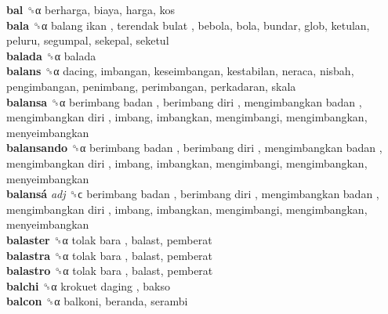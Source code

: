\textbf{bal} ␝α  berharga, biaya, harga, kos  \\
\textbf{bala} ␝α   balang ikan ,  terendak bulat , bebola, bola, bundar, glob, ketulan, peluru, segumpal, sekepal, seketul  \\
\textbf{balada} ␝α  balada  \\
\textbf{balans} ␝α  dacing, imbangan, keseimbangan, kestabilan, neraca, nisbah, pengimbangan, penimbang, perimbangan, perkadaran, skala  \\
\textbf{balansa} ␝α   berimbang badan ,  berimbang diri ,  mengimbangkan badan ,  mengimbangkan diri , imbang, imbangkan, mengimbangi, mengimbangkan, menyeimbangkan  \\
\textbf{balansando} ␝α   berimbang badan ,  berimbang diri ,  mengimbangkan badan ,  mengimbangkan diri , imbang, imbangkan, mengimbangi, mengimbangkan, menyeimbangkan  \\
\textbf{balansá} \emph{adj}  ␝ϲ   berimbang badan ,  berimbang diri ,  mengimbangkan badan ,  mengimbangkan diri , imbang, imbangkan, mengimbangi, mengimbangkan, menyeimbangkan  \\
\textbf{balaster} ␝α   tolak bara , balast, pemberat  \\
\textbf{balastra} ␝α   tolak bara , balast, pemberat  \\
\textbf{balastro} ␝α   tolak bara , balast, pemberat  \\
\textbf{balchi} ␝α   krokuet daging , bakso  \\
\textbf{balcon} ␝α  balkoni, beranda, serambi  \\
